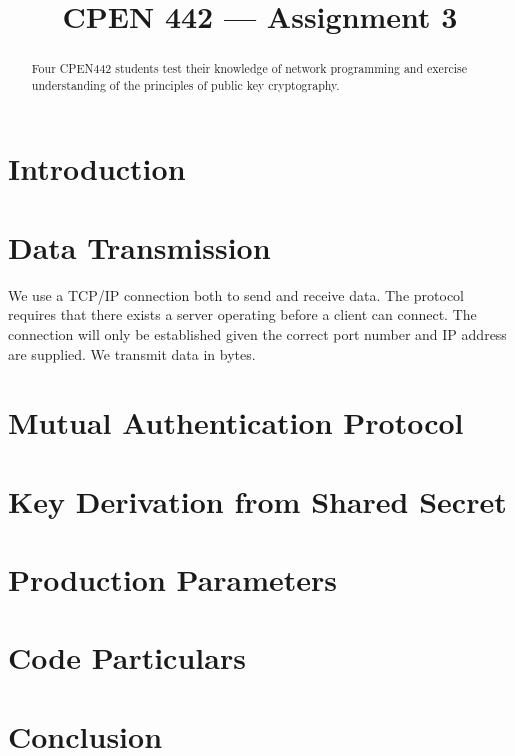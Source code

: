\documentclass[conference]{IEEEtran}
\begin{document}
\title{CPEN 442 --- Assignment 3}


\author{
\and
{}
}


\maketitle

\begin{abstract}
Four CPEN442 students test their knowledge of network programming and exercise understanding of the principles of public key cryptography. 
\end{abstract}



\section{Introduction}

\section{Data Transmission}
We use a TCP/IP connection both to send and receive data. The protocol requires that there exists a server operating before a client can connect. The connection will only be established given the correct port number and IP address are supplied. We transmit data in bytes. 
\section{Mutual Authentication Protocol}
\section{Key Derivation from Shared Secret}
\section{Production Parameters}
\section{Code Particulars}




\section{Conclusion}



\end{document}
